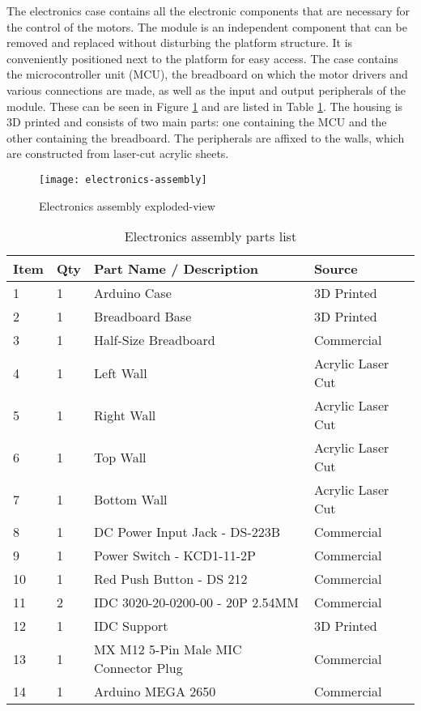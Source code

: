 The electronics case contains all the electronic components that are necessary for the control of the motors. The module is an independent component that can be removed and replaced without disturbing the platform structure. It is conveniently positioned next to the platform for easy access. The case contains the microcontroller unit (MCU), the breadboard on which the motor drivers and various connections are made, as well as the input and output peripherals of the module. These can be seen in Figure \ref{fig:electronics-assembly} and are listed in Table \ref{tab:electronics-assembly}. The housing is 3D printed and consists of two main parts: one containing the MCU and the other containing the breadboard. The peripherals are affixed to the walls, which are constructed from laser-cut acrylic sheets.

\begin{figure}[H]
    \centering
    \texttt{[image: electronics-assembly]}
    \caption{Electronics assembly exploded-view}
    \label{fig:electronics-assembly}
\end{figure}

\begin{table}[h]
    \centering
    \caption{Electronics assembly parts list}
    \label{tab:electronics-assembly}
    \begin{tabular}{llll}
    \toprule
    Item & Qty & Part Name / Description & Source \\
    \midrule
    1 & 1 & Arduino Case & 3D Printed \\
    2 & 1 & Breadboard Base & 3D Printed \\
    3 & 1 & Half-Size Breadboard & Commercial \\
    4 & 1 & Left Wall & Acrylic Laser Cut \\
    5 & 1 & Right Wall & Acrylic Laser Cut \\
    6 & 1 & Top Wall & Acrylic Laser Cut \\
    7 & 1 & Bottom Wall & Acrylic Laser Cut \\
    8 & 1 & DC Power Input Jack - DS-223B & Commercial \\
    9 & 1 & Power Switch - KCD1-11-2P & Commercial \\
    10 & 1 & Red Push Button - DS 212 & Commercial \\
    11 & 2 & IDC 3020-20-0200-00 - 20P 2.54MM & Commercial \\
    12 & 1 & IDC Support & 3D Printed \\
    13 & 1 & MX M12 5-Pin Male MIC Connector Plug & Commercial \\
    14 & 1 & Arduino MEGA 2650 & Commercial \\
    \bottomrule
    \end{tabular}
\end{table}

